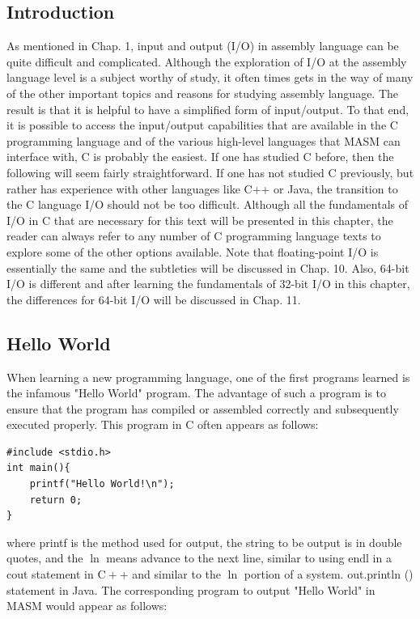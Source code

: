 \documentclass[10pt]{book}
\begin{document}
\subsection{Introduction}
As mentioned in Chap. 1, input and output (I/O) in assembly language can be quite difficult and complicated. Although the exploration of I/O at the assembly language level is a subject worthy of study, it often times gets in the way of many of the other important topics and reasons for studying assembly language. The result is that it is helpful to have a simplified form of input/output. To that end, it is possible to access the input/output capabilities that are available in the C programming language and of the various high-level languages that MASM can interface with, C is probably the easiest. If one has studied C before, then the following will seem fairly straightforward. If one has not studied C previously, but rather has experience with other languages like C++ or Java, the transition to the C language I/O should not be too difficult. Although all the fundamentals of I/O in C that are necessary for this text will be presented in this chapter, the reader can always refer to any number of C programming language texts to explore some of the other options available. Note that floating-point I/O is essentially the same and the subtleties will be discussed in Chap. 10. Also, 64-bit I/O is different and after learning the fundamentals of 32-bit I/O in this chapter, the differences for 64-bit I/O will be discussed in Chap. 11.

\subsection{Hello World}
When learning a new programming language, one of the first programs learned is the infamous "Hello World" program. The advantage of such a program is to ensure that the program has compiled or assembled correctly and subsequently executed properly. This program in C often appears as follows:

\begin{verbatim}
#include <stdio.h>
int main(){
    printf("Hello World!\n");
    return 0;
}
\end{verbatim}

where printf is the method used for output, the string to be output is in double quotes, and the $\ln$ means advance to the next line, similar to using endl in a cout statement in $\mathrm{C}++$ and similar to the $\ln$ portion of a system. out.println () statement in Java. The corresponding program to output "Hello World" in MASM would appear as follows:
\end{document}
